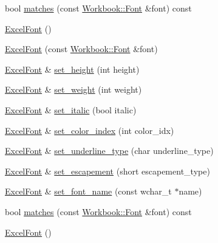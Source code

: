 \begin{DoxyCompactItemize}
\item 
bool \hyperlink{struct_excel_format_1_1_excel_font_a2c5de250568466dbbcad3d2ef1460388}{matches} (const \hyperlink{struct_y_excel_1_1_workbook_1_1_font}{Workbook\+::\+Font} \&font) const 
\item 
\hyperlink{struct_excel_format_1_1_excel_font_a06e546a746b5b731d48c1531f45e0b3b}{Excel\+Font} ()
\item 
\hyperlink{struct_excel_format_1_1_excel_font_affa5cb83d9b5be05ef394acd8452073b}{Excel\+Font} (const \hyperlink{struct_y_excel_1_1_workbook_1_1_font}{Workbook\+::\+Font} \&font)
\item 
\hyperlink{struct_excel_format_1_1_excel_font}{Excel\+Font} \& \hyperlink{struct_excel_format_1_1_excel_font_ad9eda977cf0f19737925b9dd738f0445}{set\+\_\+height} (int height)
\item 
\hyperlink{struct_excel_format_1_1_excel_font}{Excel\+Font} \& \hyperlink{struct_excel_format_1_1_excel_font_ae6457b21735f17cb6c24c1759e6aeecc}{set\+\_\+weight} (int weight)
\item 
\hyperlink{struct_excel_format_1_1_excel_font}{Excel\+Font} \& \hyperlink{struct_excel_format_1_1_excel_font_a893e59f906e610c249df9484bb6529dd}{set\+\_\+italic} (bool italic)
\item 
\hyperlink{struct_excel_format_1_1_excel_font}{Excel\+Font} \& \hyperlink{struct_excel_format_1_1_excel_font_a4f8bdbec4f4b32407fe678c9604bafe9}{set\+\_\+color\+\_\+index} (int color\+\_\+idx)
\item 
\hyperlink{struct_excel_format_1_1_excel_font}{Excel\+Font} \& \hyperlink{struct_excel_format_1_1_excel_font_ad51c538a26b70365f8712e84395656bd}{set\+\_\+underline\+\_\+type} (char underline\+\_\+type)
\item 
\hyperlink{struct_excel_format_1_1_excel_font}{Excel\+Font} \& \hyperlink{struct_excel_format_1_1_excel_font_a45ed6e358dee2e5863b983b6c17cb952}{set\+\_\+escapement} (short escapement\+\_\+type)
\item 
\hyperlink{struct_excel_format_1_1_excel_font}{Excel\+Font} \& \hyperlink{struct_excel_format_1_1_excel_font_a5351eb021de4e91a78c46fd914fb78be}{set\+\_\+font\+\_\+name} (const wchar\+\_\+t $\ast$name)
\item 
bool \hyperlink{struct_excel_format_1_1_excel_font_a2c5de250568466dbbcad3d2ef1460388}{matches} (const \hyperlink{struct_y_excel_1_1_workbook_1_1_font}{Workbook\+::\+Font} \&font) const 
\item 
\hyperlink{struct_excel_format_1_1_excel_font_a06e546a746b5b731d48c1531f45e0b3b}{Excel\+Font} ()

\end{DoxyCompactItemize}
